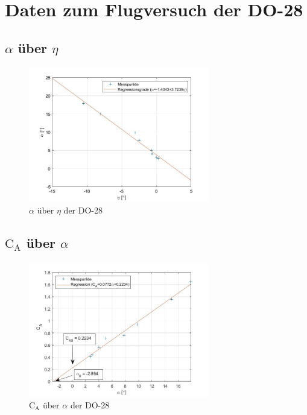 \section{Daten zum Flugversuch der DO-28}

\subsection{$\alpha$ über $\eta$}

\begin{figure}[H]
	\centering	\includegraphics[width=0.7\textwidth]{./Bilder/alpha_eta_plot.jpg}
	\caption{$\alpha$ über $\eta$ der DO-28}
	\label{fig:alpha_eta_DO28}
\end{figure}

\subsection{$\mathrm{C}_{\mathrm{A}}$ über $\alpha$}

\begin{figure}[H]
	\centering	\includegraphics[width=0.7\textwidth]{./Bilder/CA_alpha_plot.jpg}
	\caption{$\mathrm{C}_{\mathrm{A}}$ über $\alpha$ der DO-28}
	\label{fig:CA_alpha_DO28}
\end{figure}

